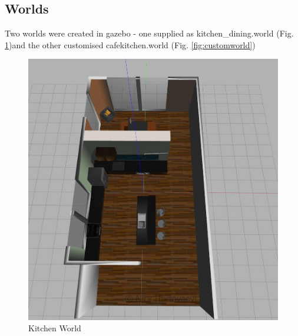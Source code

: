 \documentclass[10pt,journal,compsoc]{IEEEtran}
\begin{document}
\subsection{Worlds}
Two worlds were created in gazebo - one supplied as kitchen\_dining.world (Fig. \ref{fig:kitchenworld})and the other customised cafekitchen.world (Fig. \ref{fig:customworld})
\begin{figure}[thpb]
      \centering
      \includegraphics[width=\linewidth]{images/gazebokitchenworld}
      \caption{Kitchen World}
      \label{fig:kitchenworld}
\end{figure}
\end{document}

